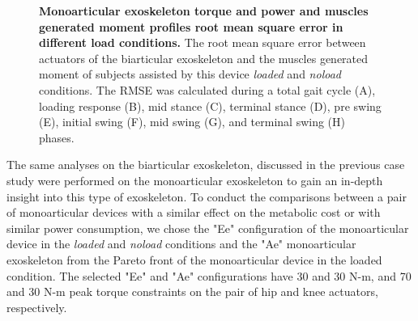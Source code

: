 \documentclass[10pt,letterpaper]{article}
\begin{document}
\begin{figure}[ht!]
	\centering
	\hfil
	\vspace{1mm}
	\caption{\small{\textbf{Monoarticular exoskeleton torque and power and muscles generated moment profiles root mean square error in different load conditions.} The root mean square error between actuators of the biarticular exoskeleton and the muscles generated moment of subjects assisted by this device {\it loaded} and {\it noload} conditions. The RMSE was calculated during a total gait cycle (A), loading response (B), mid stance (C), terminal stance (D), pre swing (E), initial swing (F), mid swing (G), and terminal swing (H) phases.}}
	\label{Fig_Case04_RMSE}
\end{figure}
The same analyses on the biarticular exoskeleton, discussed in the previous case study were performed on the monoarticular exoskeleton to gain an in-depth insight into this type of exoskeleton. To conduct the comparisons between a pair of monoarticular devices with a similar effect on the metabolic cost or with similar power consumption, we chose the "Ee" configuration of the monoarticular device in the {\it loaded} and {\it noload} conditions and the "Ae" monoarticular exoskeleton from the Pareto front of the monoarticular device in the loaded condition. The selected "Ee" and "Ae" configurations have 30 and 30 N-m, and 70 and 30 N-m peak torque constraints on the pair of hip and knee actuators, respectively.\\
\end{document}
